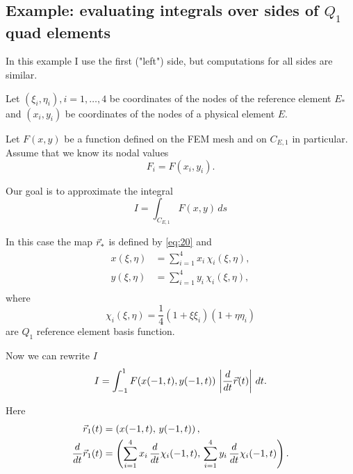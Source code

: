 \documentclass[11pt]{article}
\begin{document}
\subsection{Example: evaluating integrals over sides of $Q_{1}$ quad elements}
\label{sec-3-1}

In this example I use the first ("left") side, but computations for
all sides are similar.

Let $(\xi_{i}, \eta_{i}), i = 1,\dots,4$ be coordinates of the nodes
of the reference element $E_{*}$ and $(x_{i}, y_{i})$ be coordinates
of the nodes of a physical element $E$.

Let $F(x,y)$ be a function defined on the FEM mesh and on $C_{E,1}$ in
particular. Assume that we know its nodal values
\begin{equation}
\label{eq:23}
F_{i} = F(x_{i}, y_{i}).
\end{equation}

Our goal is to approximate the integral
\begin{equation}
\label{eq:24}
I = \int_{C_{E,1}} F(x,y)\, ds
\end{equation}

In this case the map $\vec r_{*}$ is defined by \eqref{eq:20} and
\begin{equation}
\label{eq:25}
\begin{aligned}
x(\xi,\eta) &= \sum_{i=1}^{4} x_{i}\, \chi_{i}(\xi, \eta),\\
y(\xi,\eta) &= \sum_{i=1}^{4} y_{i}\, \chi_{i}(\xi, \eta),\\
\end{aligned}
\end{equation}
where
\begin{equation}
\label{eq:26}
\chi_{i}(\xi,\eta) = \frac14 (1 + \xi\xi_{i})(1 + \eta\eta_{i})
\end{equation}
are $Q_{1}$ reference element basis function.

Now we can rewrite $I$
\begin{equation}
\label{eq:27}
I = \int_{-1}^{1} F(x(-1, t), y(-1, t))\, \left|\frac{d}{dt}\vec r(t) \right|\, dt.
\end{equation}

Here
\begin{align}
\label{eq:28}
\vec r_{1}(t) &= \left( x(-1,t),\, y(-1,t) \right),\\
\frac{d}{dt} \vec r_{1}(t) &= \left( \sum_{i=1}^{4} x_{i}\, \frac{d}{dt}\chi_{i}(-1, t),\,
                                 \sum_{i=1}^{4} y_{i}\, \frac{d}{dt}\chi_{i}(-1, t)  \right).
\end{align}
\end{document}
